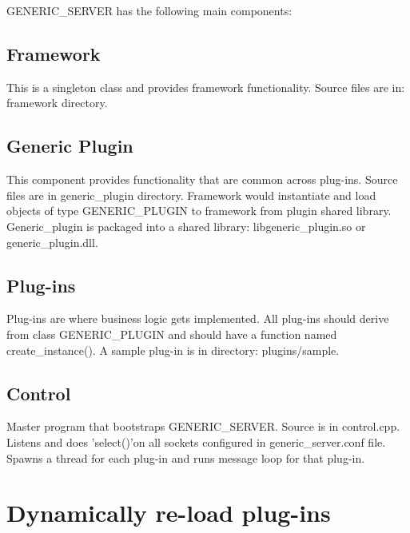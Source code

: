 \begin{DoxyVerb}   GENERIC_SERVER has the following main components:
\end{DoxyVerb}
\hypertarget{index_FR}{}\subsection{Framework}\label{index_FR}
\begin{DoxyVerb}   This is a singleton class and provides framework functionality. Source files are in: framework directory.
\end{DoxyVerb}
\hypertarget{index_GE}{}\subsection{Generic Plugin}\label{index_GE}
\begin{DoxyVerb}   This component provides functionality that are common across plug-ins. Source files are in
   generic_plugin directory. Framework would instantiate and load objects of type GENERIC_PLUGIN 
   to framework from plugin shared library. Generic_plugin is packaged into a shared library:
   libgeneric_plugin.so or generic_plugin.dll.
\end{DoxyVerb}
\hypertarget{index_PL}{}\subsection{Plug-\/ins}\label{index_PL}
\begin{DoxyVerb}   Plug-ins are where business logic gets implemented. All plug-ins should derive from class GENERIC_PLUGIN
   and should have a function named create_instance(). A sample plug-in is in directory: plugins/sample.
\end{DoxyVerb}
\hypertarget{index_Control}{}\subsection{Control}\label{index_Control}
Master program that bootstraps G\-E\-N\-E\-R\-I\-C\-\_\-\-S\-E\-R\-V\-E\-R. Source is in control.\-cpp. Listens and does 'select()'on all sockets configured in generic\-\_\-server.\-conf file. Spawns a thread for each plug-\/in and runs message loop for that plug-\/in. \par
 \par
 \hypertarget{index_DY}{}\section{Dynamically re-\/load plug-\/ins}\label{index_DY}
